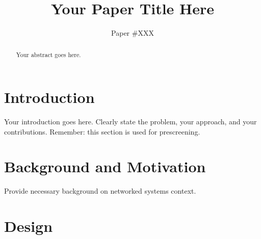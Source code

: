 \documentclass[letterpaper,twocolumn,10pt]{article}
\begin{document}
\title{Your Paper Title Here}

\author{Paper \#XXX}  %

\maketitle

\begin{abstract}
Your abstract goes here.
\end{abstract}

\section{Introduction}
\label{sec:intro}

%

Your introduction goes here. Clearly state the problem, your approach,
and your contributions. Remember: this section is used for prescreening.

\section{Background and Motivation}
\label{sec:background}

Provide necessary background on networked systems context.

\section{Design}
\label{sec:design}
\end{document}
